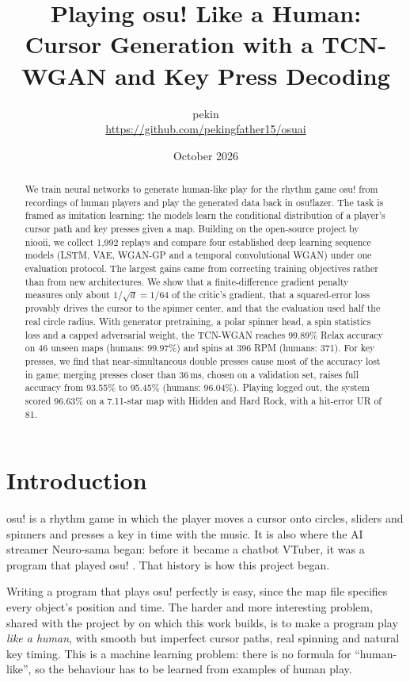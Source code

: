 \documentclass[11pt,a4paper]{article}
\title{Playing osu! Like a Human:\\Cursor Generation with a TCN-WGAN and Key Press Decoding}
\author{pekin\\\small\url{https://github.com/pekingfather15/osuai}}
\date{October 2026}
\begin{document}
\maketitle

\begin{abstract}
We train neural networks to generate human-like play for the rhythm game osu! from recordings of human
players and play the generated data back in osu!lazer. The task is framed as imitation learning: the
models learn the conditional distribution of a player's cursor path and key presses given a map. Building
on the open-source project by niooii, we collect 1{,}992 replays and compare four established deep learning
sequence models (LSTM, VAE, WGAN-GP and a temporal convolutional WGAN) under one evaluation protocol. The
largest gains came from correcting training objectives rather than from new architectures. We show that
a finite-difference gradient penalty measures only about $1/\sqrt{d}=1/64$ of the critic's gradient,
that a squared-error loss provably drives the cursor to the spinner center, and that the evaluation used
half the real circle radius. With generator pretraining, a polar spinner head, a spin statistics loss and
a capped adversarial weight, the TCN-WGAN reaches 99.89\% Relax accuracy on 46 unseen maps (humans:
99.97\%) and spins at 396 RPM (humans: 371). For key presses, we find that near-simultaneous double presses
cause most of the accuracy lost in game; merging presses closer than 36\,ms, chosen on a validation set,
raises full accuracy from 93.55\% to 95.45\% (humans: 96.04\%). Playing logged out, the system scored
96.63\% on a 7.11-star map with Hidden and Hard Rock, with a hit-error UR of 81.
\end{abstract}

\section{Introduction}
osu! is a rhythm game in which the player moves a cursor onto circles, sliders and spinners and presses a
key in time with the music. It is also where the AI streamer Neuro-sama began: before it became a chatbot
VTuber, it was a program that played osu! \citep{neurosama}. That history is how this project began.

Writing a program that plays osu! perfectly is easy, since the map file specifies every object's position
and time. The harder and more interesting problem, shared with the project by \citet{niooii} on which this
work builds, is to make a program play \emph{like a human}, with smooth but imperfect cursor paths, real
spinning and natural key timing. This is a machine learning problem: there is no
formula for ``human-like'', so the behaviour has to be learned from examples of human play.
\end{document}
